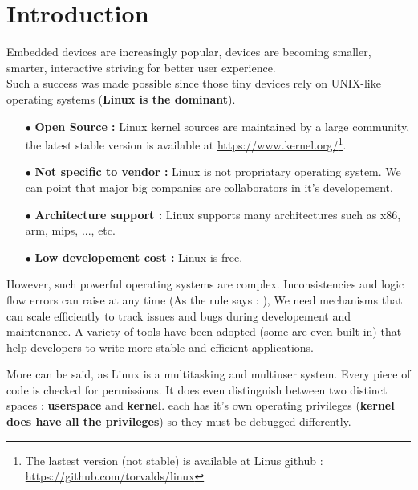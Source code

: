 \section{Introduction}
 Embedded devices are increasingly popular, devices are becoming smaller, smarter, interactive striving for better user experience.\\

Such a success was made possible since those tiny devices rely on UNIX-like operating systems (\textbf{Linux is the dominant}). 

\begin{itemize}
	\item[$\bullet$] \textbf{Open Source : } Linux kernel sources are maintained by a large community, the latest stable version is available at {\color{blue}\url{https://www.kernel.org/}}\footnote{The lastest version (not stable) is available at Linus github : {\color{blue}\url{https://github.com/torvalds/linux}}}.
	
	\item[$\bullet$] \textbf{Not specific to vendor : } Linux is not propriatary operating system. We can point that major big companies are collaborators in it's developement.
	
	\item[$\bullet$] \textbf{Architecture support : } Linux supports many architectures such as x86, arm, mips, ..., etc.
	
	\item[$\bullet$] \textbf{Low developement cost : } Linux is free. 
\end{itemize}

\vspace{10px}

However, such powerful operating systems are complex. Inconsistencies and logic flow errors can raise at any time (As the rule says :  \fg),
We need mechanisms that can scale efficiently to track issues and bugs during developement and maintenance. A variety of tools have been adopted (some are even built-in) that help developers to write more stable and efficient applications.\\

\vspace{10px}

More can be said, as Linux is a multitasking and multiuser system. Every piece of code is checked for permissions. It
does even distinguish between two distinct spaces : \textbf{userspace} and \textbf{kernel}. each has it's own operating privileges (\textbf{kernel does have all the privileges}) so they must be debugged differently.
